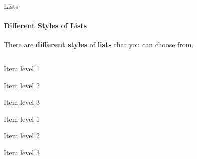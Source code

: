 \documentclass[aspectratio=169]{beamer}
\begin{document}
\begin{frame}{Lists}
    \framesubtitle{Different Styles of Lists}

    \begin{coloredblock}[yellow]
        \centering
        There are \textbf{different styles} of \textbf{lists} that you can choose from.
    \end{coloredblock}

    \vspace{-0.5cm}

    \begin{columns}
        \begin{column}{0.49\textwidth}
            \begin{coloredblock}
                \begin{romanenumerate}
                    \item Item level 1
                    \begin{romanenumerate}
                        \item Item level 2
                        \begin{romanenumerate}
                            \item Item level 3
                        \end{romanenumerate}
                    \end{romanenumerate}
                \end{romanenumerate}
            \end{coloredblock}
    
            \begin{coloredblock}
                \begin{boxenumerate}
                \item Item level 1
                    \begin{boxenumerate}
                        \item Item level 2
                        \begin{boxenumerate}
                            \item Item level 3
                        \end{boxenumerate}
                    \end{boxenumerate}
                \end{boxenumerate}
            \end{coloredblock}
        

\end{column}
\end{columns}
\end{frame}
\end{document}
